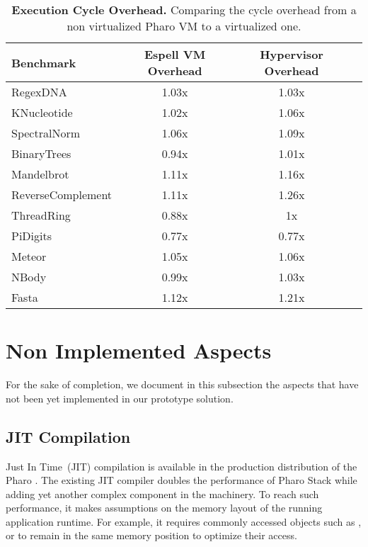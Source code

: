 \begin{table}[ht]

 	\centering
 	\begin{tabular}{lccc}%
			\toprule
			\textbf{Benchmark}
 			& \textbf{Espell VM Overhead}
			& \textbf{Hypervisor Overhead}\\
		\midrule
		RegexDNA & 1.03x & 1.03x \\\midrule
		KNucleotide & 1.02x & 1.06x \\\midrule
		SpectralNorm & 1.06x & 1.09x \\\midrule
		BinaryTrees & 0.94x & 1.01x  \\\midrule
		Mandelbrot & 1.11x & 1.16x \\\midrule
		ReverseComplement & 1.11x & 1.26x \\\midrule
		ThreadRing & 0.88x & 1x \\\midrule
		PiDigits & 0.77x & 0.77x \\\midrule
		Meteor & 1.05x & 1.06x \\\midrule
		NBody & 0.99x & 1.03x \\\midrule
		Fasta & 1.12x & 1.21x \\\bottomrule
 	\end{tabular}
	\vspace*{0.2cm}
 	\caption{\textbf{Execution Cycle Overhead.} Comparing the cycle overhead from a non virtualized Pharo VM to a virtualized one.\label{tb:benchmarks_comparison}}
\end{table}

\section{Non Implemented Aspects} \label{sec:not_yet_implemented}
 
For the sake of completion, we document in this subsection the aspects that have not been yet implemented in our prototype solution.

\subsection{JIT Compilation}

Just In Time~(JIT) compilation is available in the production distribution of the Pharo \VM. The existing JIT compiler doubles the performance of Pharo Stack \VM while adding yet another complex component in the \VM machinery. To reach such performance, it makes assumptions on the memory layout of the running application runtime. For example, it requires commonly accessed objects such as ,  or  to remain in the same memory position to optimize their access.

